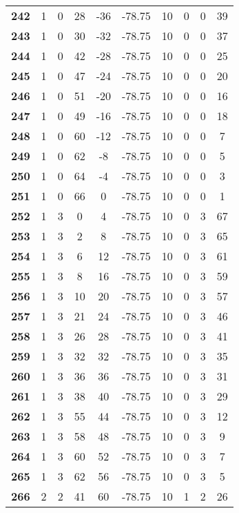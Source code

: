 \documentclass[12pt,letterpaper, onecolumn]{exam}
\begin{document}
\begin{longtable}{cccccccccc}
    \textbf{242} & 1 & 0 & 28 & -36 & -78.75 & 10 & 0 & 0 & 39 \\ 
    \textbf{243} & 1 & 0 & 30 & -32 & -78.75 & 10 & 0 & 0 & 37 \\ 
    \textbf{244} & 1 & 0 & 42 & -28 & -78.75 & 10 & 0 & 0 & 25 \\ 
    \textbf{245} & 1 & 0 & 47 & -24 & -78.75 & 10 & 0 & 0 & 20 \\ 
    \textbf{246} & 1 & 0 & 51 & -20 & -78.75 & 10 & 0 & 0 & 16 \\ 
    \textbf{247} & 1 & 0 & 49 & -16 & -78.75 & 10 & 0 & 0 & 18 \\ 
    \textbf{248} & 1 & 0 & 60 & -12 & -78.75 & 10 & 0 & 0 & 7 \\ 
    \textbf{249} & 1 & 0 & 62 & -8 & -78.75 & 10 & 0 & 0 & 5 \\ 
    \textbf{250} & 1 & 0 & 64 & -4 & -78.75 & 10 & 0 & 0 & 3 \\ 
    \textbf{251} & 1 & 0 & 66 & 0 & -78.75 & 10 & 0 & 0 & 1 \\ 
    \textbf{252} & 1 & 3 & 0 & 4 & -78.75 & 10 & 0 & 3 & 67 \\ 
    \textbf{253} & 1 & 3 & 2 & 8 & -78.75 & 10 & 0 & 3 & 65 \\ 
    \textbf{254} & 1 & 3 & 6 & 12 & -78.75 & 10 & 0 & 3 & 61 \\ 
    \textbf{255} & 1 & 3 & 8 & 16 & -78.75 & 10 & 0 & 3 & 59 \\ 
    \textbf{256} & 1 & 3 & 10 & 20 & -78.75 & 10 & 0 & 3 & 57 \\ 
    \textbf{257} & 1 & 3 & 21 & 24 & -78.75 & 10 & 0 & 3 & 46 \\ 
    \textbf{258} & 1 & 3 & 26 & 28 & -78.75 & 10 & 0 & 3 & 41 \\ 
    \textbf{259} & 1 & 3 & 32 & 32 & -78.75 & 10 & 0 & 3 & 35 \\ 
    \textbf{260} & 1 & 3 & 36 & 36 & -78.75 & 10 & 0 & 3 & 31 \\ 
    \textbf{261} & 1 & 3 & 38 & 40 & -78.75 & 10 & 0 & 3 & 29 \\ 
    \textbf{262} & 1 & 3 & 55 & 44 & -78.75 & 10 & 0 & 3 & 12 \\ 
    \textbf{263} & 1 & 3 & 58 & 48 & -78.75 & 10 & 0 & 3 & 9 \\ 
    \textbf{264} & 1 & 3 & 60 & 52 & -78.75 & 10 & 0 & 3 & 7 \\ 
    \textbf{265} & 1 & 3 & 62 & 56 & -78.75 & 10 & 0 & 3 & 5 \\ 
    \textbf{266} & 2 & 2 & 41 & 60 & -78.75 & 10 & 1 & 2 & 26 \\ 

\end{longtable}
\end{document}
